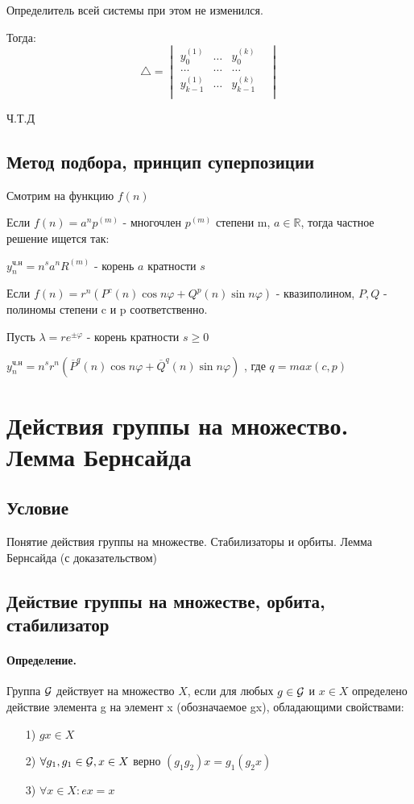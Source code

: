 \documentclass{report}
\begin{document}
Определитель всей системы при этом не изменился.

Тогда:
\[
	\triangle = \begin{vmatrix}
		y_{0}^{(1)}& \ldots& y_{0}^{(k)}&\\
		\ldots& \ldots& \ldots& \\
		y_{k-1}^{(1)}& \ldots& y_{k-1}^{(k)}&\\
	\end{vmatrix}
\] 

Ч.Т.Д

\subsection{Метод подбора, принцип суперпозиции}
Смотрим на функцию $f(n)$

\medskip

Если $f(n) = a^{n}p^{(m)}$ - многочлен $p^{(m)}$ степени m, $a \in \mathbb{R}$, тогда
частное решение ищется так:

$y_{n}^{\mbox{ч.н}} = n^{s}a^{n}R^{(m)}$ - корень $a$ кратности  $s$

\medskip

Если  $f(n) = r^{n}(P^{c}(n)\cos n\varphi + Q^{p}(n)\sin n\varphi)$ - квазиполином, $P,Q$ -
полиномы степени c и p соответственно.

Пусть  $\lambda = re^{\pm \varphi}$ - корень кратности $s \ge 0$

$y_{n}^{\mbox{ч.н}} = n^{s}r^{n}(\overline{P}^{q}(n)\cos n\varphi + \overline{Q}^{q}(n)\sin n\varphi)$ 
, где $q = max(c,p)$

\newpage

\section{Действия группы на  множество. Лемма Бернсайда}
\subsection{Условие}
Понятие действия группы на множестве. Стабилизаторы и орбиты. Лемма Бернсайда (с
доказательством)

\subsection{Действие группы на множестве, орбита, стабилизатор}
\paragraph*{Определение.}
Группа $ {\cal G}$ действует на множество $X$, если для любых  $g \in {\cal G}$ и $x \in X$
определено действие элемента g на элемент x (обозначаемое gx), обладающими свойствами:
\begin{itemize}
	\item[1)] $gx \in X$
	\item[2)] $\forall g_1,g_1 \in {\cal G}, x \in X$ верно $(g_1g_2)x = g_1(g_2x)$
	\item[3)] $\forall x \in X: ex = x$ 
\end{itemize}
\end{document}
